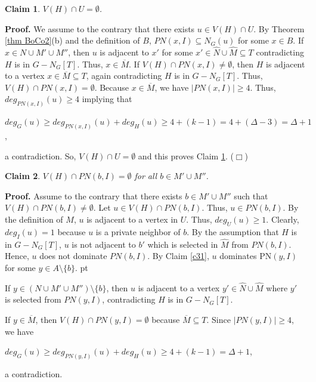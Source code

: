 \documentclass[11pt]{article}
\newtheorem{claim}{Claim}
\newcommand{\smallqed}{{\tiny ($\Box$)}}
\newcommand{\proof}{\noindent\textbf{Proof. }}
\newcommand{\2}{ \vspace{0.2cm} }
\newcommand{\1}{ \vspace{0.1cm} }
\begin{document}
\begin{claim}\label{c33}
$V(H) \cap U = \emptyset$.
\end{claim}
\proof
We assume to the contrary that there exists $u \in V(H) \cap U$. By Theorem \ref{thm BoCo2}(b) and the definition of $B$, $PN(x, I) \subseteq N_{G}(u)$ for some $x \in B$.
If $x \in N \cup M' \cup M''$, then $u$ is adjacent to $x'$ for some $x' \in \hat{N} \cup \hat{M} \subseteq T$ contradicting $H$ is in $G - N_{G}[T]$. Thus, $x \in \overline{M}$. If $V(H) \cap PN(x, I) \neq \emptyset$, then $H$ is adjacent to a vertex $x \in \overline{M} \subseteq T$, again contradicting $H$ is in $G - N_{G}[T]$. Thus, $V(H) \cap PN(x, I) = \emptyset$. Because $x \in \overline{M}$, we have $|PN(x, I)| \geq 4$. Thus, $deg_{PN(x, I)}(u) \geq 4$ implying that
\begin{center}
  $deg_{G}(u) \geq deg_{PN(x, I)}(u) + deg_{H}(u) \geq 4 + (k - 1) = 4 + (\Delta - 3) = \Delta + 1$,
\end{center}
\noindent a contradiction. So, $V(H) \cap U = \emptyset$ and this proves Claim \ref{c33}.
\smallqed



\begin{claim}\label{c34}
$V(H) \cap PN(b, I) = \emptyset$ for all $b \in M' \cup M''$.
\end{claim}
\proof
Assume to the contrary that there exists $b \in M' \cup M''$ such that $V(H) \cap PN(b, I) \neq \emptyset$. Let $u \in V(H) \cap PN(b, I)$. Thus, $u \in PN(b, I)$. By the definition of $M$, $u$ is adjacent to a vertex in $U$. Thus, $deg _{U}(u) \geq 1$. Clearly, $deg_{I}(u) = 1$ because $u$ is a private neighbor of $b$. By the assumption that $H$ is in $G - N_{G}[T]$, $u$ is not adjacent to $b'$ which is selected in $\hat{M}$ from $PN(b, I)$. Hence, $u$ does not dominate $PN(b, I)$. By Claim \ref{c31}, $u$ dominates PN$(y,I)$ for some $y\in A\setminus \{b\}$.
 pt

\indent
If $y \in (N \cup M' \cup M'') \setminus \{b\}$, then $u$ is adjacent to a vertex $y' \in \hat{N} \cup \hat{M}$ where $y'$ is selected from $PN(y, I)$, contradicting $H$ is in $G - N_{G}[T]$.


If $y \in \overline{M}$, then $V(H) \cap PN(y, I) = \emptyset$ because $\overline{M} \subseteq T.$ Since $|PN(y, I)| \geq 4$,
we have
\begin{center}
$deg_{G}(u) \geq deg_{PN(y, I)}(u) + deg_{H}(u) \geq 4 + (k - 1) = \Delta + 1$,
\end{center}
\noindent a contradiction.
\end{document}
